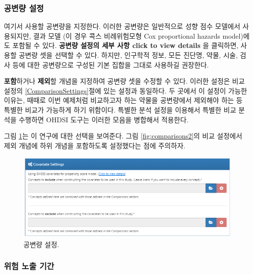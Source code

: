 \documentclass[10.5pt]{book}
\theoremstyle{definition}
\theoremstyle{definition}
\theoremstyle{definition}
\theoremstyle{remark}
\begin{document}
\subsubsection*{공변량 설정}\label{-}

여기서 사용할 공변량을 지정한다. 이러한 공변량은 일반적으로 성향 점수
모델에서 사용되지만, 결과 모델 (이 경우 콕스 비례위험모형 Cox
proportional hazards model)에도 포함될 수 있다. \textbf{공변량 설정의
세부 사항 click to view details} 을 클릭하면, 사용할 공변량 셋을 선택할
수 있다. 하지만, 인구학적 정보, 모든 진단명, 약물, 시술, 검사 등에 대한
공변량으로 구성된 기본 집합을 그대로 사용하길 권장한다.

\textbf{포함}하거나 \textbf{제외}할 개념을 지정하여 공변량 셋을 수정할
수 있다. 이러한 설정은 비교 설정의 \ref{ComparisonSettings}절에 있는
설정과 동일하다. 두 곳에서 이 설정이 가능한 이유는, 때때로 이번 예제처럼
비교하고자 하는 약물을 공변량에서 제외해야 하는 등 특별한 비교가
가능하게 하기 위함이다. 특별한 분석 설정을 이용해서 특별한 비교 분석을
수행하면 OHDSI 도구는 이러한 모음을 병합해서 적용한다.

그림 \ref{fig:covariateSettings}는 이 연구에 대한 선택을 보여준다. 그림
\ref{fig:comparisons2}의 비교 설정에서 제외 개념에 하위 개념을
포함하도록 설정했다는 점에 주의하자.

\begin{figure}

{\centering \includegraphics[width=1\linewidth]{images/PopulationLevelEstimation/covariateSettings} 

}

\caption{공변량 설정.}\label{fig:covariateSettings}
\end{figure}

\subsubsection*{위험 노출 기간}\label{--}
\end{document}
